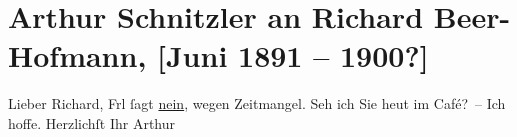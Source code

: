 

         
         \renewcommand{\erwaehntePersonen}{Personen: Richard Beer-Hofmann, Lillian Russell}
         \renewcommand{\erwaehnteWerke}{}
               \section[Arthur Schnitzler an Richard Beer-Hofmann, {[}Juni 1891 – 1900?{]}]{ Arthur Schnitzler an Richard Beer-Hofmann, {[}Juni 1891 – 1900?{]}}\nopagebreak{}\rehead{ }\begin{ledgroupsized}[t]{13cm}\normalsize\beginnumbering \toendnotes[C]{\smallbreak\pagebreak[2]} 
\toendnotes[C]{\smallbreak}\pstart
           \noindent{}{\pb}Lieber Richard, Frl \label{K_L00017_1v}\label{K_L00017_1h} ſagt \uline{nein}, wegen Zeitmangel.\pend
           \pstart
           Seh ich Sie heut im Café? – Ich hoffe. Herzlichſt\pend
           \pstart Ihr \spacefill\mbox{Arthur}\pend{}
         
         \endnumbering{}\end{ledgroupsized}  \newcommand{\dateiname}{L00017}\newcommand{\titel}{Arthur Schnitzler an Richard Beer-Hofmann, [Juni 1891 – 1900?]}\newcommand{\editorInnen}{Martin Anton Müller und Gerd-Hermann Susen}
      